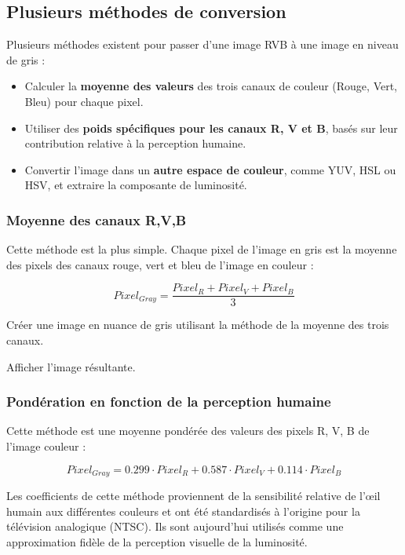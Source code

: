 \documentclass[a4paper,11pt,titlepage]{article} %
\begin{document}
\subsection{Plusieurs méthodes de conversion}

Plusieurs méthodes existent pour passer d'une image RVB à une image en niveau de gris :

\begin{itemize}
	\item Calculer la \textbf{moyenne des valeurs} des trois canaux de couleur (Rouge, Vert, Bleu) pour chaque pixel.
	\item Utiliser des \textbf{poids spécifiques pour les canaux R, V et B}, basés sur leur contribution relative à la perception humaine.
	\item Convertir l'image dans un \textbf{autre espace de couleur}, comme YUV, HSL ou HSV, et extraire la composante de luminosité.
\end{itemize}

\subsubsection{Moyenne des canaux R,V,B}

Cette méthode est la plus simple. Chaque pixel de l'image en gris est la moyenne des pixels des canaux rouge, vert et bleu de l'image en couleur :

$$Pixel_{Gray} = \frac{Pixel_{R} + Pixel_{V} + Pixel_{B}}{3}$$ 

\Manip Créer une image en nuance de gris utilisant la méthode de la moyenne des trois canaux.

\Manip Afficher l'image résultante.


\subsubsection{Pondération en fonction de la perception humaine}

Cette méthode est une moyenne pondérée des valeurs des pixels R, V, B de l'image couleur : 

$$Pixel_{Gray} = 0.299 \cdot Pixel_{R} + 0.587 \cdot Pixel_{V} + 0.114 \cdot Pixel_{B}$$ 


Les coefficients de cette méthode proviennent de la sensibilité relative de l'œil humain aux différentes couleurs et ont été standardisés à l'origine pour la télévision analogique (NTSC). Ils sont aujourd'hui utilisés comme une approximation fidèle de la perception visuelle de la luminosité.
\end{document}
